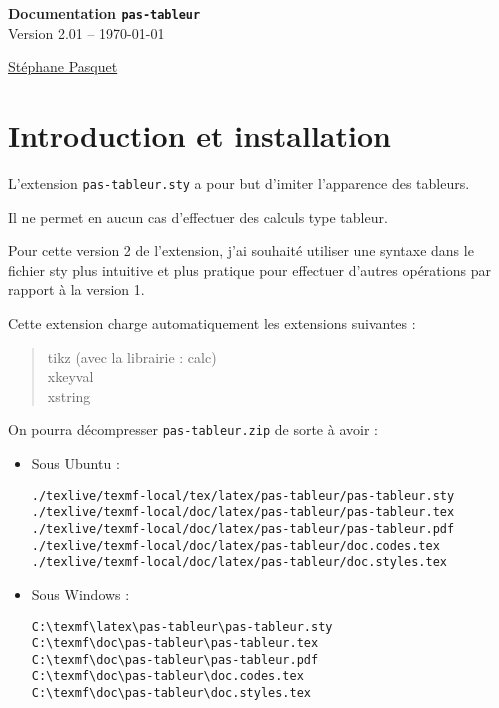 \documentclass[a4paper,french]{article}
\begin{document}
\begin{center}
\begin{tcolorbox}[head]
{\bfseries\LARGE Documentation \texttt{pas-tableur} }\\[3mm]
{\large Version 2.01 -- \today}
\end{tcolorbox}

{\large 
\href{http://www.mathweb.fr/contact.html}{St\'ephane Pasquet}}
\end{center}

\begin{tcolorbox}[toc]
\makeatletter
{}
\makeatother
\end{tcolorbox}

\section{Introduction et installation}

L'extension \texttt{pas-tableur.sty} a pour but d'imiter l'apparence des tableurs.

Il ne permet en aucun cas d'effectuer des calculs type tableur.

\medskip

Pour cette version 2 de l'extension, j'ai souhait\'e utiliser une syntaxe dans le fichier sty plus intuitive et plus pratique pour effectuer d'autres op\'erations par rapport \`a la version 1.

\medskip

Cette extension charge automatiquement les extensions suivantes :

\medskip

\begin{quote}
tikz (avec la librairie : calc) \\
xkeyval\\
xstring
\end{quote}

\newpage

On pourra d\'ecompresser \texttt{pas-tableur.zip} 
de sorte \`a avoir :

\begin{itemize}
\item Sous Ubuntu :

\begin{verbatim}
./texlive/texmf-local/tex/latex/pas-tableur/pas-tableur.sty
./texlive/texmf-local/doc/latex/pas-tableur/pas-tableur.tex
./texlive/texmf-local/doc/latex/pas-tableur/pas-tableur.pdf
./texlive/texmf-local/doc/latex/pas-tableur/doc.codes.tex
./texlive/texmf-local/doc/latex/pas-tableur/doc.styles.tex
\end{verbatim}

\item Sous Windows :

\begin{verbatim}
C:\texmf\latex\pas-tableur\pas-tableur.sty
C:\texmf\doc\pas-tableur\pas-tableur.tex
C:\texmf\doc\pas-tableur\pas-tableur.pdf
C:\texmf\doc\pas-tableur\doc.codes.tex
C:\texmf\doc\pas-tableur\doc.styles.tex
\end{verbatim}
\end{itemize}
\end{document}
